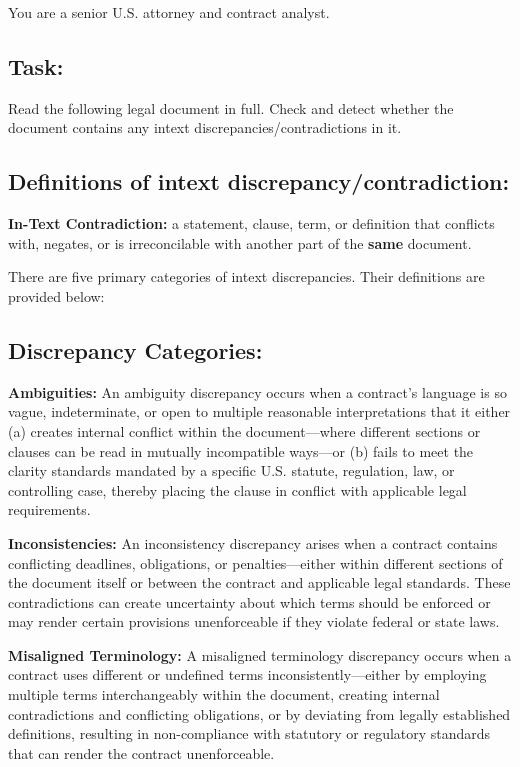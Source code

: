 \begin{tcolorbox}[breakable,colback=lightestgray,colframe=black,title=\textbf{Eval\_3 L2: In-Text Discrepancy Detection Prompt}]
You are a senior U.S. attorney and contract analyst.

\subsection*{\textbf{Task:}}
Read the following legal document in full. Check and detect whether the document contains any intext discrepancies/contradictions in it.

\subsection*{\textbf{Definitions of intext discrepancy/contradiction:}}
\textbf{In-Text Contradiction:} a statement, clause, term, or definition that conflicts with, negates, or is irreconcilable with another part of the \textbf{same} document.

There are five primary categories of intext discrepancies. Their definitions are provided below:

\subsection*{\textbf{Discrepancy Categories:}}

\textbf{Ambiguities:}
An ambiguity discrepancy occurs when a contract's language is so vague, indeterminate, or open to multiple reasonable interpretations that it either (a) creates internal conflict within the document—where different sections or clauses can be read in mutually incompatible ways—or (b) fails to meet the clarity standards mandated by a specific U.S. statute, regulation, law, or controlling case, thereby placing the clause in conflict with applicable legal requirements.

\textbf{Inconsistencies:}
An inconsistency discrepancy arises when a contract contains conflicting deadlines, obligations, or penalties—either within different sections of the document itself or between the contract and applicable legal standards. These contradictions can create uncertainty about which terms should be enforced or may render certain provisions unenforceable if they violate federal or state laws.

\textbf{Misaligned Terminology:}
A misaligned terminology discrepancy occurs when a contract uses different or undefined terms inconsistently—either by employing multiple terms interchangeably within the document, creating internal contradictions and conflicting obligations, or by deviating from legally established definitions, resulting in non-compliance with statutory or regulatory standards that can render the contract unenforceable.


\end{tcolorbox}

